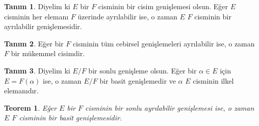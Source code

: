 \documentclass{article}
\newtheorem{thm}{Teorem}[section]
\theoremstyle{definition}
\newtheorem{defn}{Tanım}[section]
\theoremstyle{remark}
\begin{document}
    	    \begin{defn}
    	        Diyelim ki $E$ bir $F$ cisminin bir cisim genişlemesi olsun. Eğer $E$ cisminin her elemanı $F$ üzerinde ayrılabilir ise, o zaman $E$ $F$ cisminin bir ayrılabilir genişlemesidir.
    	    \end{defn}
    	    
    	    \begin{defn}
    	        Eğer bir $F$ cisminin tüm cebirsel genişlemeleri ayrılabilir ise, o zaman $F$ bir mükemmel cisimdir.
    	    \end{defn}
    	    
    	    \begin{defn}
    	        Diyelim ki $E/F$ bir sonlu genişleme olsun. Eğer bir $\alpha \in E$ için $E = F(\alpha)$ ise, o zaman $E/F$ bir basit genişlemedir ve $\alpha$ $E$ cisminin ilkel elemanıdır.
    	    \end{defn}
    	    
    	    \begin{thm}
    	        Eğer $E$ bir $F$ cisminin bir sonlu ayrılabilir genişlemesi ise, o zaman $E$ $F$ cisminin bir basit genişlemesidir.
    	    \end{thm}
    	    
\end{document}
